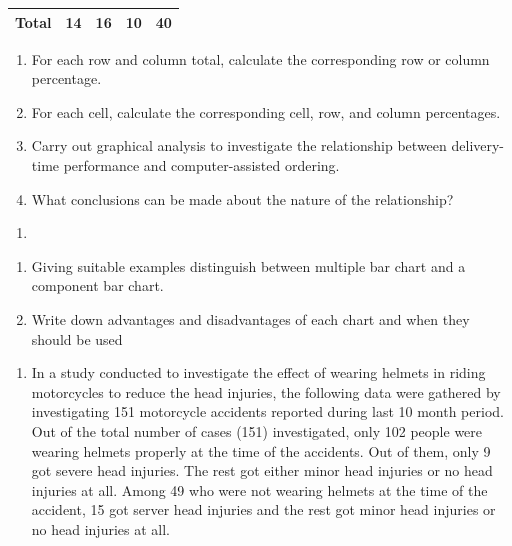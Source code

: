 \documentclass[]{book}
\providecommand{\tightlist}{%
  \setlength{\itemsep}{0pt}\setlength{\parskip}{0pt}}
\begin{document}
\begin{longtable}[]{@{}lllll@{}}
\begin{minipage}[t]{0.16\columnwidth}\raggedright
Total\strut
\end{minipage} & \begin{minipage}[t]{0.18\columnwidth}\raggedright
14\strut
\end{minipage} & \begin{minipage}[t]{0.19\columnwidth}\raggedright
16\strut
\end{minipage} & \begin{minipage}[t]{0.15\columnwidth}\raggedright
10\strut
\end{minipage} & \begin{minipage}[t]{0.18\columnwidth}\raggedright
40\strut
\end{minipage}\tabularnewline
\bottomrule
\end{longtable}

\begin{enumerate}
\def\labelenumi{\alph{enumi})}
\tightlist
\item
  For each row and column total, calculate the corresponding row or column percentage.
\item
  For each cell, calculate the corresponding cell, row, and column percentages.
\item
  Carry out graphical analysis to investigate the relationship between delivery-time performance and computer-assisted ordering.
\item
  What conclusions can be made about the nature of the relationship?
\end{enumerate}

\begin{enumerate}
\def\labelenumi{\arabic{enumi}.}
\setcounter{enumi}{5}
\item
\end{enumerate}

\begin{enumerate}
\def\labelenumi{\alph{enumi})}
\tightlist
\item
  Giving suitable examples distinguish between multiple bar chart and a component bar chart.
\item
  Write down advantages and disadvantages of each chart and when they should be used
\end{enumerate}

\begin{enumerate}
\def\labelenumi{\arabic{enumi}.}
\setcounter{enumi}{6}
\tightlist
\item
  In a study conducted to investigate the effect of wearing helmets in riding motorcycles to reduce the head injuries, the following data were gathered by investigating 151 motorcycle accidents reported during last 10 month period. Out of the total number of cases (151) investigated, only 102 people were wearing helmets properly at the time of the accidents. Out of them, only 9 got severe head injuries. The rest got either minor head injuries or no head injuries at all. Among 49 who were not wearing helmets at the time of the accident, 15 got server head injuries and the rest got minor head injuries or no head injuries at all.
\end{enumerate}
\end{document}
